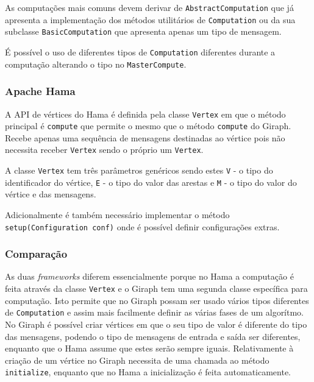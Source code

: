 As computações mais comuns devem derivar de \texttt{AbstractComputation} que já apresenta a implementação dos métodos utilitários de \texttt{Computation} ou da sua subclasse \texttt{BasicComputation} que apresenta apenas um tipo de mensagem.

É possível o uso de diferentes tipos de \texttt{Computation} diferentes durante a computação alterando o tipo no \texttt{MasterCompute}.

\subsubsection*{Apache Hama}
A API de vértices do Hama é definida pela classe \texttt{Vertex} em que o método principal é \texttt{compute} que permite o mesmo que o método \texttt{compute} do Giraph. Recebe apenas uma sequência de mensagens destinadas ao vértice pois não necessita receber \texttt{Vertex} sendo o próprio um \texttt{Vertex}.

A classe \texttt{Vertex} tem três parâmetros genéricos sendo estes \texttt{V} - o tipo do identificador do vértice, \texttt{E} - o tipo do valor das arestas e \texttt{M} - o tipo do valor do vértice e das mensagens.


Adicionalmente é também necessário implementar o método \texttt{setup(Configuration conf)} onde é possível definir configurações extras.
\subsubsection*{Comparação}


As duas \textit{frameworks} diferem essencialmente porque no Hama a computação é feita através da classe \texttt{Vertex} e o Giraph tem uma segunda classe específica para computação. Isto permite que no Giraph possam ser usado vários tipos diferentes de \texttt{Computation} e assim mais facilmente definir as várias fases de um algorítmo.
No Giraph é possível criar vértices em que o seu tipo de valor é diferente do tipo das mensagens, podendo o tipo de mensagens de entrada e saída ser diferentes, enquanto que o Hama assume que estes serão sempre iguais. Relativamente à criação de um vértice no Giraph necessita de uma chamada ao método \texttt{initialize}, enquanto que no Hama a inicialização é feita automaticamente.